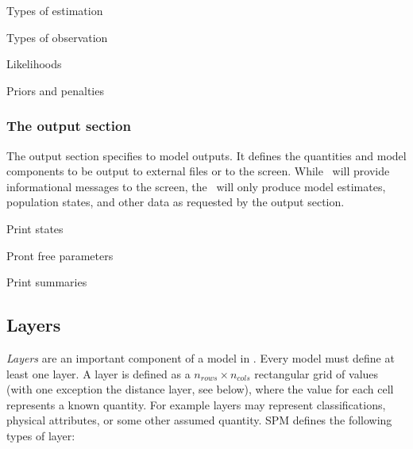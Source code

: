 Types of estimation

Types of observation

Likelihoods

Priors and penalties


\subsubsection{The output section}

The output section specifies to model outputs. It defines the quantities and model components to be output to external files or to the screen. While \SPM\ will provide informational messages to the screen, the \SPM\ will only produce model estimates, population states, and other data as requested by the output section. 

Print states

Pront free parameters

Print summaries


\subsection{Layers\label{sec:layers}}

\emph{Layers} are an important component of a model in \SPM. Every model must define at least one layer. A layer is defined as a $n_{rows} \times n_{cols}$ rectangular grid of values (with one exception \textemdash the distance layer, see below), where the value for each cell represents a known quantity. For example layers may represent classifications, physical attributes, or some other assumed quantity. SPM defines the following types of layer:

